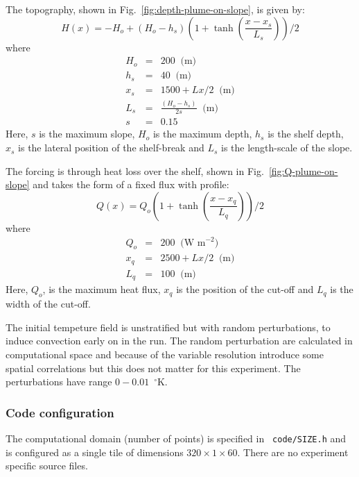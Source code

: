 The topography, shown in Fig.~\ref{fig:depth-plume-on-slope}, is given
by:
\begin{displaymath}
H(x) = -H_o + (H_o - h_s) ( 1 + \tanh{\left(\frac{x-x_s}{L_s}\right)} ) / 2
\end{displaymath}
where
\begin{eqnarray*}
H_o & = & 200 \;\; \mbox{(m)} \\
h_s & = & 40 \;\; \mbox{(m)} \\
x_s & = & 1500 + Lx/2 \;\; \mbox{(m)} \\
L_s & = & \frac{(H_o - h_s)}{2 s} \;\; \mbox{(m)} \\
s & = & 0.15
\end{eqnarray*}
Here, $s$ is the maximum slope, $H_o$ is the maximum depth, $h_s$ is
the shelf depth, $x_s$ is the lateral position of the shelf-break and
$L_s$ is the length-scale of the slope.

The forcing is through heat loss over the shelf, shown in
Fig.~\ref{fig:Q-plume-on-slope} and takes the form of a fixed flux
with profile:
\begin{displaymath}
Q(x) = Q_o ( 1 + \tanh{\left(\frac{x - x_q}{L_q}\right)} ) / 2
\end{displaymath}
where
\begin{eqnarray*}
Q_o & = & 200 \;\; \mbox{(W m$^{-2}$)} \\
x_q & = & 2500 + Lx/2 \;\; \mbox{(m)} \\
L_q & = & 100 \;\; \mbox{(m)}
\end{eqnarray*}
Here, $Q_o$, is the maximum heat flux, $x_q$ is the position of the
cut-off and $L_q$ is the width of the cut-off.

The initial tempeture field is unstratified but with random
perturbations, to induce convection early on in the run. The random
perturbation are calculated in computational space and because of the
variable resolution introduce some spatial correlations but this does
not matter for this experiment. The perturbations have range
$0-0.01$~$^\circ$K.

\subsubsection{Code configuration}
\label{sect:plume-config}

The computational domain (number of points) is specified in {\tt
code/SIZE.h} and is configured as a single tile of dimensions
$320\times1\times60$. There are no experiment specific source files.

